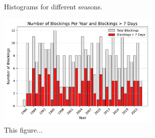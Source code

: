 \begin{figure}[H]
    \hfill
    
    \caption{Histograms for different seasons.}
    \label{fig:histograms}
\end{figure}

\begin{figure}[H]
    \centering    \includegraphics[width=0.7\textwidth]{Figures/BlockingsPerYear.pdf}
    \caption{This figure...}
    \label{fig:BlockingsPerYear}
\end{figure}